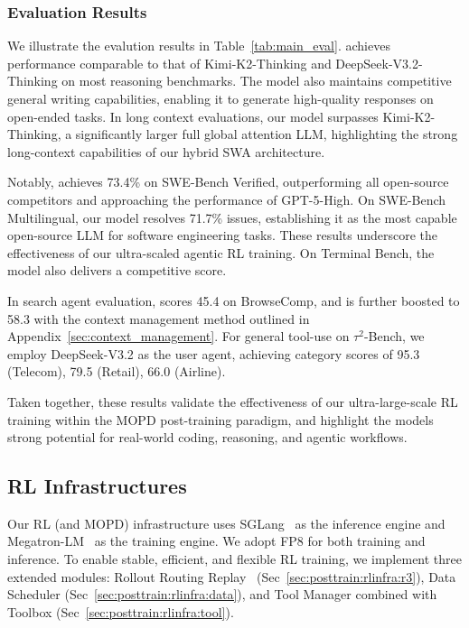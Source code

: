 \subsubsection{Evaluation Results}

We illustrate the evalution results in Table~\ref{tab:main_eval}.
\mimoflash{} achieves performance comparable to that of Kimi-K2-Thinking and DeepSeek-V3.2-Thinking on most reasoning benchmarks.
The model also maintains competitive general writing capabilities, enabling it to generate high-quality responses on open-ended tasks.
In long context evaluations, our model surpasses Kimi-K2-Thinking, a significantly larger full global attention LLM, highlighting the strong long-context capabilities of our hybrid SWA architecture.

Notably, \mimoflash{} achieves 73.4\% on SWE-Bench Verified, outperforming all open-source competitors and approaching the performance of GPT-5-High.
On SWE-Bench Multilingual, our model resolves 71.7\% issues, establishing it as the most capable open-source LLM for software engineering tasks.
These results underscore the effectiveness of our ultra-scaled agentic RL training. On Terminal Bench, the model also delivers a competitive score. 

In search agent evaluation, \mimoflash{} scores 45.4 on BrowseComp, and is further boosted to 58.3 with the context management method outlined in Appendix~\ref{sec:context_management}.
For general tool-use on $\tau^2$-Bench, we employ DeepSeek-V3.2 as the user agent, achieving category scores of 95.3 (Telecom), 79.5 (Retail), 66.0 (Airline).

Taken together, these results validate the effectiveness of our ultra-large-scale RL training within the MOPD post-training paradigm, and highlight the models strong potential for real-world coding, reasoning, and agentic workflows.





\subsection{RL Infrastructures}

Our RL (and MOPD) infrastructure uses SGLang~\citep{zheng2024sglang} as the inference engine and Megatron-LM~\citep{shoeybi2019megatron} as the training engine.
We adopt FP8 for both training and inference.
To enable stable, efficient, and flexible RL training, we implement three extended modules: Rollout Routing Replay~\citep{ma2025stabilizing} (Sec~\ref{sec:posttrain:rlinfra:r3}), Data Scheduler (Sec~\ref{sec:posttrain:rlinfra:data}), and Tool Manager combined with Toolbox (Sec~\ref{sec:posttrain:rlinfra:tool}).

